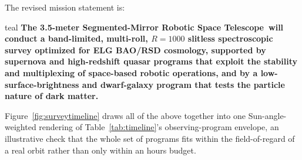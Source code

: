 \documentclass[10pt,onecolumn]{article}
\newcommand{\facility}{3.5-meter Segmented-Mirror Robotic Space Telescope}
\begin{document}
The revised mission statement is:
\begin{leadbox}[title=Mission Statement]{teal}
\textbf{The \facility\ will conduct a band-limited, multi-roll, $R=1000$ slitless spectroscopic survey optimized for ELG BAO/RSD cosmology, supported by supernova and high-redshift quasar programs that exploit the stability and multiplexing of space-based robotic operations, and by a low-surface-brightness and dwarf-galaxy program that tests the particle nature of dark matter.}
\end{leadbox}

Figure~\ref{fig:surveytimeline} draws all of the above together into one Sun-angle-weighted rendering of Table~\ref{tab:timeline}'s observing-program envelope, an illustrative check that the whole set of programs fits within the field-of-regard of a real orbit rather than only within an hours budget.
\end{document}
